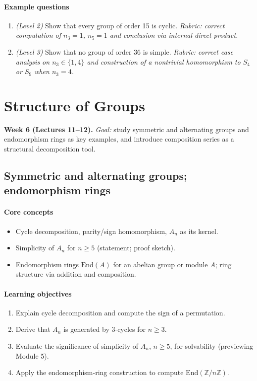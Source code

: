 \documentclass{article}
\begin{document}
\paragraph{Example questions}
\begin{enumerate}[nosep]
  \item \emph{(Level 2)} Show that every group of order 15 is cyclic. \emph{Rubric: correct computation of $n_3=1$, $n_5=1$ and conclusion via internal direct product.}
  \item \emph{(Level 3)} Show that no group of order 36 is simple. \emph{Rubric: correct case analysis on $n_3 \in \{1,4\}$ and construction of a nontrivial homomorphism to $S_4$ or $S_9$ when $n_3=4$.}
\end{enumerate}

\section{Structure of Groups}
\textbf{Week 6 (Lectures 11--12).} \emph{Goal:} study symmetric and alternating groups and endomorphism rings as key examples, and introduce composition series as a structural decomposition tool.

\subsection{Symmetric and alternating groups; endomorphism rings}
\paragraph{Core concepts}
\begin{itemize}[nosep]
  \item Cycle decomposition, parity/sign homomorphism, $A_n$ as its kernel.
  \item Simplicity of $A_n$ for $n \geq 5$ (statement; proof sketch).
  \item Endomorphism rings $\mathrm{End}(A)$ for an abelian group or module $A$; ring structure via addition and composition.
\end{itemize}
\paragraph{Learning objectives}
\begin{enumerate}[nosep]
  \item Explain cycle decomposition and compute the sign of a permutation.
  \item Derive that $A_n$ is generated by 3-cycles for $n \geq 3$.
  \item Evaluate the significance of simplicity of $A_n$, $n\ge 5$, for solvability (previewing Module 5).
  \item Apply the endomorphism-ring construction to compute $\mathrm{End}(\mathbb{Z}/n\mathbb{Z})$.
\end{enumerate}
\end{document}
